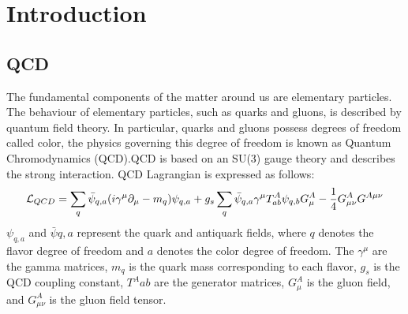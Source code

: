 
\section{Introduction}
    \subsection{QCD}
    \label{Intro:QCD}
        The fundamental components of the matter around us are elementary particles. The behaviour of elementary particles, such as quarks and gluons, is described by quantum field theory. In particular, quarks and gluons possess degrees of freedom called color, the physics governing this degree of freedom is known as Quantum Chromodynamics (QCD).\@ QCD is based on an SU(3) gauge theory and describes the strong interaction. QCD Lagrangian is expressed as follows:
        \begin{eqnarray}
            \label{QCDlagrangian}
            \mathcal{L}_{QCD}=\sum_q \bar{\psi}_{q,a}\qty(i\gamma^\mu\partial_\mu-m_q)\psi_{q,a}+g_s \sum_q \bar{\psi}_{q,a}\gamma^\mu T^A_{ab}\psi_{q,b}G^A_\mu-\frac{1}{4}G^A_{\mu\nu}G^{A\mu\nu}
        \end{eqnarray}
        $\psi_{q,a}$ and $\bar{\psi}{q,a}$ represent the quark and antiquark fields, where $q$ denotes the flavor degree of freedom and $a$ denotes the color degree of freedom. The $\gamma^\mu$ are the gamma matrices, $m_q$ is the quark mass corresponding to each flavor, $g_s$ is the QCD coupling constant, $T^A{ab}$ are the generator matrices, $G^A_\mu$ is the gluon field, and $G^A_{\mu\nu}$ is the gluon field tensor.


